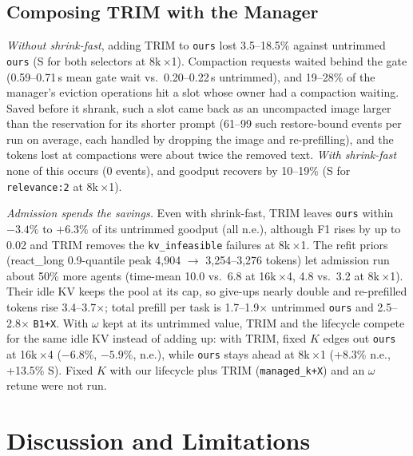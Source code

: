 \documentclass[conference]{IEEEtran}
\newcommand{\K}{$K$}
\newcommand{\x}{$\times$}
\newcommand{\cfg}[1]{\texttt{#1}}
\begin{document}
\subsection{Composing TRIM with the Manager}\label{sec:compose}
\emph{Without shrink-fast}, adding TRIM to \cfg{ours} lost 3.5--18.5\% against untrimmed \cfg{ours}
(S for both selectors at 8k\,\x1). Compaction requests waited behind the gate (0.59--0.71\,s mean
gate wait vs.\ 0.20--0.22\,s untrimmed), and 19--28\% of the manager's eviction operations hit a slot
whose owner had a compaction waiting. Saved before it shrank, such a slot came back as an uncompacted image larger than
the reservation for its shorter prompt (61--99 such restore-bound events per run on average, each
handled by dropping the image and re-prefilling), and the tokens lost at compactions were about twice
the removed text. \emph{With shrink-fast} none of this occurs (0 events), and goodput recovers by
10--19\% (S for \cfg{relevance:2} at 8k\,\x1).

\emph{Admission spends the savings.} Even with shrink-fast, TRIM leaves \cfg{ours} within $-3.4\%$ to
$+6.3\%$ of its untrimmed goodput (all n.e.), although F1 rises by up to 0.02 and TRIM removes the
\texttt{kv\_infeasible} failures at 8k\,\x1. The refit priors (react\_long 0.9-quantile peak 4,904
$\rightarrow$ 3,254--3,276 tokens) let admission run about 50\% more agents (time-mean 10.0 vs.\ 6.8 at
16k\,\x4, 4.8 vs.\ 3.2 at 8k\,\x1). Their idle KV keeps the pool at its cap, so give-ups nearly double
and re-prefilled tokens rise 3.4--3.7\x; total prefill per task is 1.7--1.9\x{} untrimmed \cfg{ours}
and 2.5--2.8\x{} \cfg{B1+X}. With $\omega$ kept at its untrimmed value, TRIM and the lifecycle compete
for the same idle KV instead of adding up: with TRIM, fixed \K{} edges out \cfg{ours} at 16k\,\x4
($-6.8\%$, $-5.9\%$, n.e.), while \cfg{ours} stays ahead at 8k\,\x1 (+8.3\% n.e., +13.5\% S).
Fixed \K{} with our lifecycle plus TRIM (\cfg{managed\_k+X}) and an $\omega$ retune were not run.

\section{Discussion and Limitations}\label{sec:disc}
\end{document}

